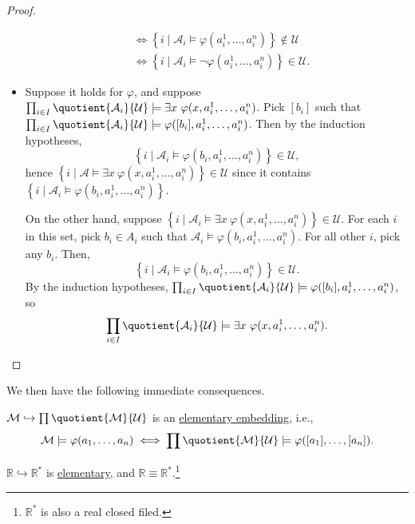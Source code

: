 \begin{proof}
\begin{itemize}
\[\begin{split}
				      &\iff \left\{ i \mid \mathcal{A} _i \models \varphi (a_i^1, \dots , a_i^n) \right\} \notin \mathcal{U} \\
				      &\iff \left\{ i \mid \mathcal{A} _i \models \lnot \varphi (a_i^1, \dots , a_i^n) \right\} \in \mathcal{U} .
			      \end{split}
		      \]
		\item Suppose it holds for \(\varphi \), and suppose \(\prod_{i\in I} \quotient{\mathcal{A}_i }{\mathcal{U} } \models \exists x\ \varphi (x, a_i^1, \dots , a_i^n)\). Pick \([b_i]\) such that \(\prod_{i\in I} \quotient{\mathcal{A}_i }{\mathcal{U} } \models \varphi ([b_i], a_i^1, \dots , a_i^n)\). Then by the induction hypotheses,
		      \[
			      \left\{ i \mid \mathcal{A} _i \models \varphi (b_i, a_i^1, \dots , a_i^n) \right\} \in \mathcal{U},
		      \]
		      hence \(\left\{ i \mid \mathcal{A} \models \exists x\ \varphi (x, a_i^1, \dots , a_i^n) \right\} \in \mathcal{U} \) since it contains \(\left\{ i \mid \mathcal{A} _i \models \varphi (b_i, a_i^1, \dots , a_i^n) \right\}\).

		      On the other hand, suppose \(\left\{ i \mid \mathcal{A} _i \models \exists x\ \varphi (x, a_i^1, \dots , a_i^n) \right\} \in \mathcal{U} \). For each \(i\) in this set, pick \(b_i\in A_i\) such that \(\mathcal{A} _i \models \varphi (b_i, a_i^1, \dots , a_i^n)\). For all other \(i\), pick any \(b_i\). Then,
		      \[
			      \left\{ i \mid \mathcal{A} _i \models \varphi (b_i, a_i^1, \dots , a_i^n) \right\} \in \mathcal{U}.
		      \]
		      By the induction hypotheses, \(\prod_{i\in I} \quotient{\mathcal{A}_i }{\mathcal{U} } \models \varphi ([b_i], a_i^1, \dots , a_i^n)\), so
		      \[
			      \prod_{i\in I} \quotient{\mathcal{A}_i }{\mathcal{U} } \models \exists x\ \varphi (x, a_i^1, \dots , a_i^n).
		      \]
	\end{itemize}
\end{proof}

We then have the following immediate consequences.

\begin{note}
	\(\mathcal{M} \hookrightarrow \prod \quotient{\mathcal{M} }{\mathcal{U} } \) is an \hyperref[def:elementary-embedding]{elementary embedding}, i.e.,
	\[
		\mathcal{M} \models \varphi (a_1, \dots , a_n) \iff \prod \quotient{\mathcal{M} }{\mathcal{U} } \models \varphi ([a_1], \dots , [a_n]).
	\]
\end{note}

\begin{eg}
	\(\mathbb{R} \hookrightarrow \mathbb{R} ^{\ast} \) is \hyperref[def:elementary-embedding]{elementary}, and \(\mathbb{R} \equiv \mathbb{R} ^{\ast} \).\footnote{\(\mathbb{R} ^{\ast} \) is also a real closed filed.}
\end{eg}

